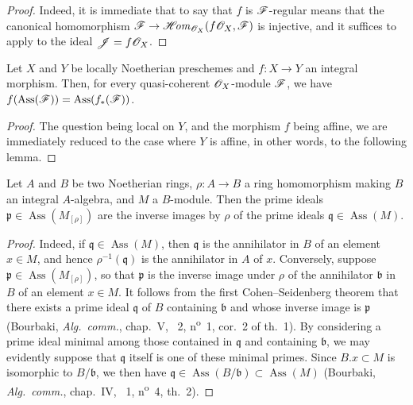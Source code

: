 \begin{proof}
Indeed, it is immediate that to say that $f$ is $\mathscr{F}$-regular means that the canonical homomorphism $\mathscr{F}\to\mathscr{H}\!\mathit{om}_{\mathscr{O}_X}(f\mathscr{O}_X,\mathscr{F})$ is injective, and it suffices to apply  to the ideal $\mathscr{J}=f\mathscr{O}_X$.
\end{proof}

\begin{proposition}[3.1.10]
\label{IV.3.1.10}
Let $X$ and $Y$ be locally Noetherian preschemes and $f:X\to Y$ an integral morphism.
Then, for every quasi-coherent $\mathscr{O}_X$-module $\mathscr{F}$, we have $f(\operatorname{Ass}(\mathscr{F}))=\operatorname{Ass}(f_*(\mathscr{F}))$.
\end{proposition}

\begin{proof}
The question being local on $Y$, and the morphism $f$ being affine, we are immediately reduced to the case where $Y$ is affine, in other words, to the following lemma.
\end{proof}


\begin{lemma}[3.1.10.1]
\label{IV.3.1.10.1}
Let $A$ and $B$ be two Noetherian rings, $\rho:A\to B$ a ring homomorphism making $B$ an integral $A$-algebra, and $M$ a $B$-module.
Then the prime ideals $\mathfrak{p}\in\operatorname{Ass}(M_{[\rho]})$ are the inverse images by $\rho$ of the prime ideals $\mathfrak{q}\in\operatorname{Ass}(M)$.
\end{lemma}

\begin{proof}
Indeed, if $\mathfrak{q}\in\operatorname{Ass}(M)$, then $\mathfrak{q}$ is the annihilator in $B$ of an element $x\in M$, and hence $\rho^{-1}(\mathfrak{q})$ is the annihilator in $A$ of $x$. Conversely, suppose $\mathfrak{p}\in\operatorname{Ass}(M_{[\rho]})$, so that $\mathfrak{p}$ is the inverse image under $\rho$ of the annihilator $\mathfrak{b}$ in $B$ of an element $x\in M$. It follows from the first Cohen--Seidenberg theorem that there exists a prime ideal $\mathfrak{q}$ of $B$ containing $\mathfrak{b}$ and whose inverse image is $\mathfrak{p}$ (Bourbaki, \emph{Alg.\ comm.}, chap.~V, \textsection~2, n\textsuperscript{o}~1, cor.~2 of th.~1). By considering a prime ideal minimal among those contained in $\mathfrak{q}$ and containing $\mathfrak{b}$, we may evidently suppose that $\mathfrak{q}$ itself is one of these minimal primes. Since $B.x\subset M$ is isomorphic to $B/\mathfrak{b}$, we then have $\mathfrak{q}\in\operatorname{Ass}(B/\mathfrak{b})\subset\operatorname{Ass}(M)$ (Bourbaki, \emph{Alg.\ comm.}, chap.~IV, \textsection~1, n\textsuperscript{o}~4, th.~2).
\end{proof}


